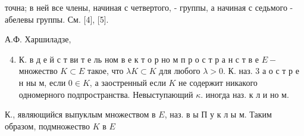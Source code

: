 \documentclass[10pt]{article}
\begin{document}
точна; в ней все члены, начиная с четвертого, - группы, а начиная с седьмого - абелевы группы. См. [4], [5].



А.Ф. Харшиладзе,



\begin{enumerate}

  \setcounter{enumi}{3}

  \item К. в д е й с т ви т е ль ном в е к т о р но м п р о с т р а н с т в е $E-$ множество $K \subset E$ такое, что $\lambda K \subset K$ для любого $\lambda>0$. К. наз. 3 а о с т р е н ны м, если $0 \in K$, а заостренный если $K$ не содержит никакого одномерного подпространства. Невыступающий $\kappa$. иногда наз. к л и но м.

\end{enumerate}



К., являющийся выпуклым множеством в $E$, наз. в ы П у к л ы м. Таким образом, подмножество $K$ в $E$
\end{document}
